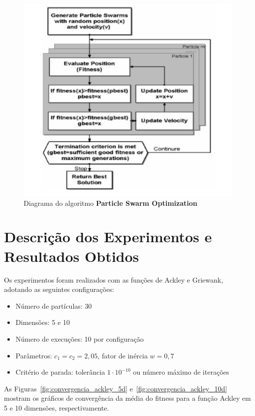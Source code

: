 \documentclass[12pt]{article}
\begin{document}
\begin{figure}[H]
    \centering
    \includegraphics[width=1\textwidth]{fluxo.png}
    \caption{Diagrama do algoritmo \textbf{Particle Swarm Optimization}}
    \label{fig:metodologia}
\end{figure}

\section{Descrição dos Experimentos e Resultados Obtidos}
\label{sec:descicao_de_experimentos_/_simulacoes_e_resultados_obtidos}

Os experimentos foram realizados com as funções de Ackley e Griewank, adotando as seguintes configurações:

\begin{itemize}
    \item Número de partículas: 30
    \item Dimensões: 5 e 10
    \item Número de execuções: 10 por configuração
    \item Parâmetros: $c_1 = c_2 = 2{,}05$, fator de inércia $w = 0{,}7$
    \item Critério de parada: tolerância $1\cdot10^{-10}$ ou número máximo de iterações
\end{itemize}

As Figuras~\ref{fig:convergencia_ackley_5d} e~\ref{fig:convergencia_ackley_10d} mostram os gráficos de convergência da média do fitness para a função Ackley em 5 e 10 dimensões, respectivamente.
\end{document}
